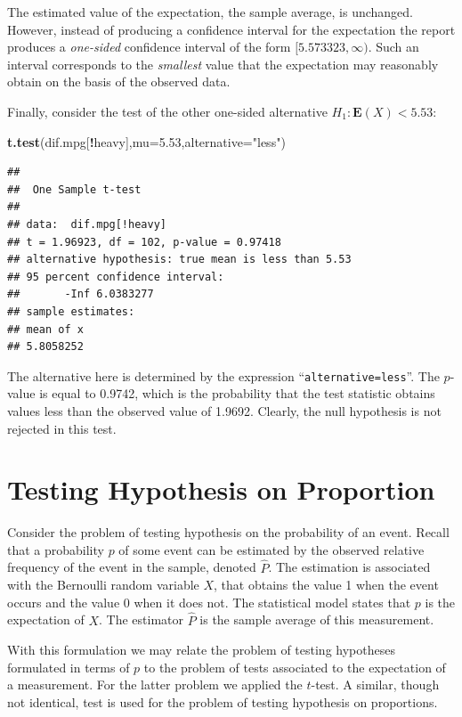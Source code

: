 \documentclass[]{krantz}
\makeatletter
\newenvironment{Shaded}{\begin{snugshade}}{\end{snugshade}}
\newcommand{\DataTypeTok}[1]{\textcolor[rgb]{0.13,0.29,0.53}{#1}}
\newcommand{\FloatTok}[1]{\textcolor[rgb]{0.00,0.00,0.81}{#1}}
\newcommand{\KeywordTok}[1]{\textcolor[rgb]{0.13,0.29,0.53}{\textbf{#1}}}
\newcommand{\NormalTok}[1]{#1}
\newcommand{\OperatorTok}[1]{\textcolor[rgb]{0.81,0.36,0.00}{\textbf{#1}}}
\newcommand{\StringTok}[1]{\textcolor[rgb]{0.31,0.60,0.02}{#1}}
\newcommand{\Expec}{\mathbf{E}}
\newenvironment{kframe}{%
\medskip{}
\setlength{\fboxsep}{.8em}
 \def\at@end@of@kframe{}%
 \ifinner\ifhmode%
  \def\at@end@of@kframe{\end{minipage}}%
  \begin{minipage}{\columnwidth}%
 \fi\fi%
 \def\FrameCommand##1{\hskip\@totalleftmargin \hskip-\fboxsep
 \colorbox{shadecolor}{##1}\hskip-\fboxsep
     \hskip-\linewidth \hskip-\@totalleftmargin \hskip\columnwidth}%
 \MakeFramed {\advance\hsize-\width
   \@totalleftmargin\z@ \linewidth\hsize
   \@setminipage}}%
 {\par\unskip\endMakeFramed%
 \at@end@of@kframe}
\renewenvironment{Shaded}{\begin{kframe}}{\end{kframe}}
\theoremstyle{definition}
\theoremstyle{definition}
\theoremstyle{definition}
\theoremstyle{remark}
\makeatother
\begin{document}
The estimated value of the expectation, the sample average, is
unchanged. However, instead of producing a confidence interval for the
expectation the report produces a \emph{one-sided} confidence interval of the
form \([5.573323, \infty)\). Such an interval corresponds to the
\emph{smallest} value that the expectation may reasonably obtain on the basis
of the observed data.

Finally, consider the test of the other one-sided alternative
\(H_1:\Expec(X) < 5.53\):

\begin{Shaded}
\begin{Highlighting}[]
\KeywordTok{t.test}\NormalTok{(dif.mpg[}\OperatorTok{!}\NormalTok{heavy],}\DataTypeTok{mu=}\FloatTok{5.53}\NormalTok{,}\DataTypeTok{alternative=}\StringTok{"less"}\NormalTok{)}
\end{Highlighting}
\end{Shaded}

\begin{verbatim}
## 
##  One Sample t-test
## 
## data:  dif.mpg[!heavy]
## t = 1.96923, df = 102, p-value = 0.97418
## alternative hypothesis: true mean is less than 5.53
## 95 percent confidence interval:
##       -Inf 6.0383277
## sample estimates:
## mean of x 
## 5.8058252
\end{verbatim}

The alternative here is determined by the expression
``\texttt{alternative=less}''. The \(p\)-value is equal to 0.9742, which is the
probability that the test statistic obtains values less than the
observed value of 1.9692. Clearly, the null hypothesis is not rejected
in this test.

\hypertarget{TestFrac}{%
\section{Testing Hypothesis on Proportion}\label{TestFrac}}

Consider the problem of testing hypothesis on the probability of an
event. Recall that a probability \(p\) of some event can be estimated by
the observed relative frequency of the event in the sample, denoted
\(\hat P\). The estimation is associated with the Bernoulli random
variable \(X\), that obtains the value 1 when the event occurs and the
value 0 when it does not. The statistical model states that \(p\) is the
expectation of \(X\). The estimator \(\hat P\) is the sample average of this
measurement.

With this formulation we may relate the problem of testing hypotheses
formulated in terms of \(p\) to the problem of tests associated to the
expectation of a measurement. For the latter problem we applied the
\(t\)-test. A similar, though not identical, test is used for the problem
of testing hypothesis on proportions.
\end{document}
